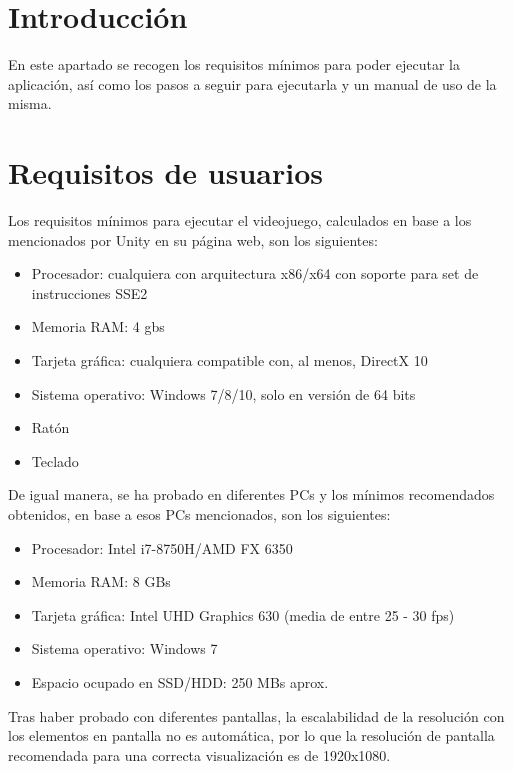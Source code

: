 
\section{Introducción}

En este apartado se recogen los requisitos mínimos para poder ejecutar la aplicación, así como los pasos a seguir para ejecutarla y un manual de uso de la misma.

\section{Requisitos de usuarios}

Los requisitos mínimos para ejecutar el videojuego, calculados en base a los mencionados por Unity en su página web, son los siguientes:

\begin{itemize}
\tightlist
	\item Procesador: cualquiera con arquitectura x86/x64 con soporte para set de instrucciones SSE2
	\item Memoria RAM: 4 gbs
	\item Tarjeta gráfica: cualquiera compatible con, al menos, DirectX 10
	\item Sistema operativo: Windows 7/8/10, solo en versión de 64 bits
	\item Ratón
	\item Teclado
\end{itemize}

De igual manera, se ha probado en diferentes PCs y los mínimos recomendados obtenidos, en base a esos PCs mencionados, son los siguientes:

\begin{itemize}
\tightlist
	\item Procesador: Intel i7-8750H/AMD FX 6350
	\item Memoria RAM: 8 GBs
	\item Tarjeta gráfica: Intel UHD Graphics 630 (media de entre 25 - 30 fps)
	\item Sistema operativo: Windows 7
	\item Espacio ocupado en SSD/HDD: 250 MBs aprox.
\end{itemize}

Tras haber probado con diferentes pantallas, la escalabilidad de la resolución con los elementos en pantalla no es automática, por lo que la resolución de pantalla recomendada para una correcta visualización es de 1920x1080.

